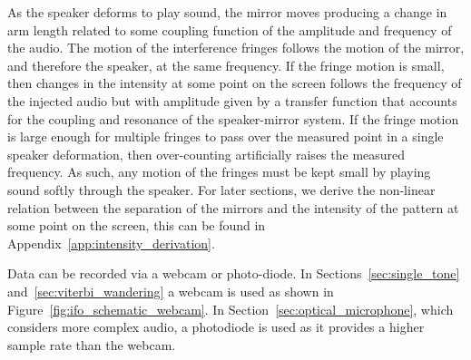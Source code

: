 \documentclass[paper-main.tex]{subfiles}
\begin{document}
As the speaker deforms to play sound, the mirror moves producing a change in arm length related to some coupling function of the amplitude and frequency of the audio. 
The motion of the interference fringes follows the motion of the mirror, and therefore the speaker, at the same frequency. 
If the fringe motion is small, then changes in the intensity at some point on the screen follows the frequency of the injected audio but with amplitude given by a transfer function that accounts for the coupling and resonance of the speaker-mirror system.
If the fringe motion is large enough for multiple fringes to pass over the measured point in a single speaker deformation, then over-counting artificially raises the measured frequency. As such, any motion of the fringes must be kept small by playing sound softly through the speaker.
For later sections, we derive the non-linear relation between the separation of the mirrors and the intensity of the pattern at some point on the screen, this can be found in Appendix~\ref{app:intensity_derivation}. %


Data can be recorded via a webcam or photo-diode. 
In Sections~\ref{sec:single_tone} and~\ref{sec:viterbi_wandering} a webcam is used as shown in Figure~\ref{fig:ifo_schematic_webcam}. 
In Section~\ref{sec:optical_microphone}, which considers more complex audio, a photodiode is used as it provides a higher sample rate than the webcam. 



\end{document}

